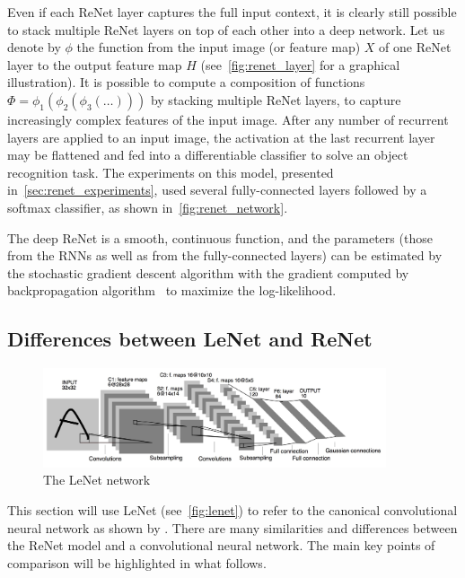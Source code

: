 Even if each ReNet layer captures the full input context, it is clearly still
possible to stack multiple ReNet layers on top of each other into a deep
network. Let us denote by $\phi$ the function from the input image (or feature
map) $X$ of one ReNet layer to the output feature map $H$
(see~\autoref{fig:renet_layer} for a graphical illustration). It is possible
to compute a composition of functions $\Phi = \phi_1(\phi_2(\phi_3(\dots)))$ by
stacking multiple ReNet layers, to capture increasingly complex features of the
input image.  After any number of recurrent layers are applied to an input
image, the activation at the last recurrent layer may be flattened and fed into
a differentiable classifier to solve an object recognition task. The
experiments on this model, presented in~\autoref{sec:renet_experiments}, used
several fully-connected layers followed by a softmax classifier, as shown
in~\autoref{fig:renet_network}.

The deep ReNet is a smooth, continuous function, and the parameters (those from
the RNNs as well as from the fully-connected layers) can be estimated by the
stochastic gradient descent algorithm with the gradient computed by
backpropagation algorithm~\citep[see, e.g.,][]{BP86} to maximize the
log-likelihood.

\subsection{Differences between LeNet and ReNet}\label{sec:lenetrenet}

\begin{figure}[t]
    \centering
    \includegraphics[width=0.9\textwidth]{img/renet/lenet5.jpg}
    \caption{The LeNet network}
    \label{fig:lenet}
    \vspace{-3mm}
\end{figure}

This section will use LeNet (see~\autoref{fig:lenet}) to refer to the canonical
convolutional neural network as shown by \citet{LeCun89}. There are many
similarities and differences between the ReNet model and a convolutional neural
network. The main key points of comparison will be highlighted in what follows.

